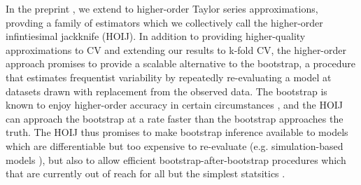 In the preprint \citet{giordano2019:hoij}, we extend
\citet{giordano:2019:ij} to higher-order Taylor series approximations,
provding a family of estimators which we collectively call the higher-order
infintiesimal jackknife (HOIJ).  In addition to providing higher-quality
approximations to CV and extending our results to k-fold CV, the higher-order
approach promises to provide a scalable alternative to the bootstrap, a
procedure that estimates frequentist variability by repeatedly re-evaluating a
model at datasets drawn with replacement from the observed data. The bootstrap
is known to enjoy higher-order accuracy in certain circumstances
\citet{hall:2013:bootstrap}, and the HOIJ can approach the bootstrap at a rate
faster than the bootstrap approaches the truth.  The HOIJ thus promises to make
bootstrap inference available to models which are differentiable but too
expensive to re-evaluate (e.g. simulation-based models
\citep{gourieroux:1993:simulation}), but also to allow efficient
bootstrap-after-bootstrap procedures which that are currently out of reach for
all but the simplest statsitics \citep{efron:1994:bootstrap}.

%


